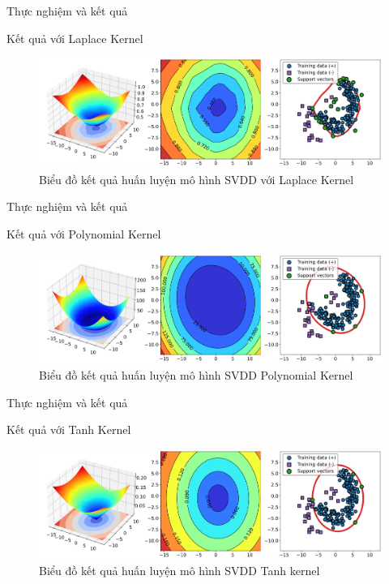 \documentclass[
	10pt,                %
	aspectratio=169,     %
]{beamer}
\begin{document}
            \begin{frame}{Thực nghiệm và kết quả}
                \begin{block}{Kết quả với Laplace Kernel}
            		\begin{figure}
                		\centering
            	\includegraphics[scale=0.22]{figures/lapl_result.png}
                		\caption{ Biểu đồ kết quả huấn luyện mô hình SVDD với Laplace Kernel}
                	\end{figure}
                \end{block}
            \end{frame}	
            \begin{frame}{Thực nghiệm và kết quả}
                \begin{block}{Kết quả với Polynomial Kernel}
            		\begin{figure}
                		\centering
            	\includegraphics[scale=0.22]{figures/poly_result.png}
                		\caption{ Biểu đồ kết quả huấn luyện mô hình SVDD Polynomial Kernel}
                	\end{figure}
                \end{block}
            \end{frame}	
            \begin{frame}{Thực nghiệm và kết quả}
                \begin{block}{Kết quả với Tanh Kernel}
            		\begin{figure}
                		\centering
            	\includegraphics[scale=0.22]{figures/tanh_result.png}
                		\caption{ Biểu đồ kết quả huấn luyện mô hình SVDD Tanh kernel}
                	\end{figure}
                \end{block}
            \end{frame}	
            
\end{document}
